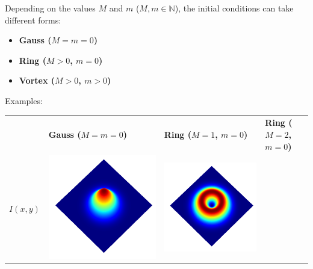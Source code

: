 \documentclass[a4paper, 12pt]{article}
\begin{document}
Depending on the values $M$ and $m$ ($M, m \in \mathbb{N}$), the initial conditions can take different forms:
\begin{itemize}
\item \textbf{Gauss ($M=m=0$)} 
\item \textbf{Ring ($M>0$, $m=0$)} 
\item \textbf{Vortex ($M>0$, $m>0$)}
\end{itemize}
Examples:
\begin{center}
\begin{tabular}{M{1cm}M{5cm}M{5cm}M{5cm}}
\ & \textbf{Gauss ($M=m=0$)} & \textbf{Ring ($M=1$, $m=0$)} & \textbf{Ring ($M=2$, $m=0$)} \\
$I(x,y)$ &
\includegraphics[width=\linewidth]{../resources/intensity_M=0.png} & 
\includegraphics[width=\linewidth]{../resources/intensity_M=1.png} & 

\end{tabular}
\end{center}
\end{document}
